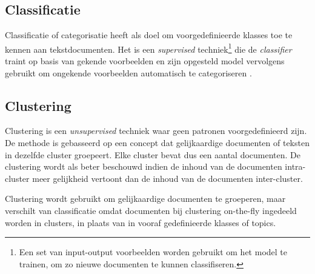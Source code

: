 \subsection{Classificatie}\label{classificatie}
Classificatie of categorisatie heeft als doel om voorgedefinieerde klasses toe te kennen aan tekstdocumenten. Het is een \textit{supervised} techniek\footnote{Een set van input-output voorbeelden worden gebruikt om het model te trainen, om zo nieuwe documenten te kunnen classifiseren.} die de \textit{classifier} traint op basis van gekende voorbeelden en zijn opgesteld model vervolgens gebruikt om ongekende voorbeelden automatisch te categoriseren \cite{Nasa2012}. 



\subsection{Clustering}\label{clustering}
Clustering is een \textit{unsupervised} techniek waar geen patronen voorgedefinieerd zijn. De methode is gebasseerd op een concept dat gelijkaardige documenten of teksten in dezelfde cluster groepeert. Elke cluster bevat dus een aantal documenten. De clustering wordt als beter beschouwd indien de inhoud van de documenten intra-cluster meer gelijkheid vertoont dan de inhoud van de documenten inter-cluster.

Clustering wordt gebruikt om gelijkaardige documenten te groeperen, maar verschilt van classificatie omdat documenten bij clustering on-the-fly ingedeeld worden in clusters, in plaats van in vooraf gedefinieerde klasses of topics.



